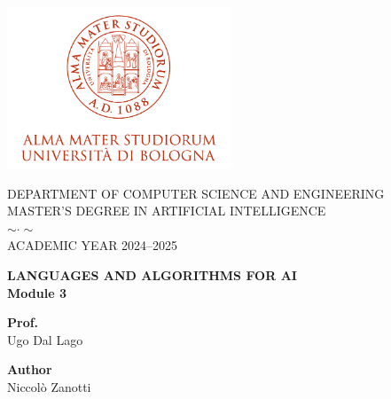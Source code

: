 \pagestyle{empty}


\titleformat{\section}[block]{\centering\bfseries\Large}{}{0pt}{}


\begin{titlepage}

	\setlength{\parindent}{0pt}

	\begin{center}
		\includegraphics[width=0.5\textwidth]{setup/unibo-logo-new.png}
	\end{center}

	\begin{center}
		\large DEPARTMENT OF COMPUTER SCIENCE AND ENGINEERING \\[0.5em]
		\large MASTER'S DEGREE IN ARTIFICIAL INTELLIGENCE \\[1em]
		$\sim \cdot \sim$ \\[1em]
		\large ACADEMIC YEAR 2024--2025
	\end{center}

	\vfill

	\begin{center}
		{\LARGE \textbf{LANGUAGES AND ALGORITHMS FOR AI}} \\[0.5em]
		{\LARGE \textbf{Module 3}}
	\end{center}

	\vfill

	\noindent
	\begin{minipage}[t]{0.48\textwidth}
		\raggedright
		\textbf{Prof.} \\
		Ugo Dal Lago
	\end{minipage}%
	\hfill
	\begin{minipage}[t]{0.48\textwidth}
		\raggedleft
		\textbf{Author} \\
		Niccolò Zanotti \\


\end{minipage}
\end{titlepage}
